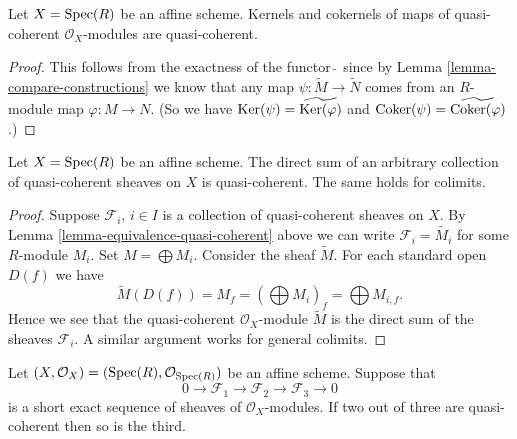 \begin{lemma}
\label{lemma-kernel-cokernel-quasi-coherent}
Let $X = \mathop{\mathrm{Spec}}(R)$ be an affine scheme.
Kernels and cokernels of maps of quasi-coherent
$\mathcal{O}_X$-modules are quasi-coherent.
\end{lemma}

\begin{proof}
This follows from the exactness of the functor $\widetilde{\ }$
since by Lemma \ref{lemma-compare-constructions} we know that any map
$\psi : \widetilde{M} \to \widetilde{N}$ comes from
an $R$-module map $\varphi : M \to N$. (So we have
$\mathop{\mathrm{Ker}}(\psi) = \widetilde{\mathop{\mathrm{Ker}}(\varphi)}$ and
$\mathop{\mathrm{Coker}}(\psi) = \widetilde{\mathop{\mathrm{Coker}}(\varphi)}$.)
\end{proof}

\begin{lemma}
\label{lemma-colimit-quasi-coherent}
Let $X = \mathop{\mathrm{Spec}}(R)$ be an affine scheme.
The direct sum of an arbitrary collection of quasi-coherent sheaves
on $X$ is quasi-coherent. The same holds for colimits.
\end{lemma}

\begin{proof}
Suppose $\mathcal{F}_i$, $i \in I$ is a collection of quasi-coherent
sheaves on $X$. By Lemma \ref{lemma-equivalence-quasi-coherent}
above we can write $\mathcal{F}_i = \widetilde{M_i}$ for some $R$-module
$M_i$. Set $M = \bigoplus M_i$. Consider the sheaf $\widetilde{M}$.
For each standard open $D(f)$ we have
$$
\widetilde{M}(D(f)) = M_f =
\left(\bigoplus M_i\right)_f =
\bigoplus M_{i, f}.
$$
Hence we see that the quasi-coherent $\mathcal{O}_X$-module
$\widetilde{M}$ is the direct sum of the sheaves $\mathcal{F}_i$.
A similar argument works for general colimits.
\end{proof}

\begin{lemma}
\label{lemma-extension-quasi-coherent}
Let $(X, \mathcal{O}_X) = (\mathop{\mathrm{Spec}}(R), \mathcal{O}_{\mathop{\mathrm{Spec}}(R)})$
be an affine scheme. Suppose that
$$
0 \to
\mathcal{F}_1 \to
\mathcal{F}_2 \to
\mathcal{F}_3 \to
0
$$
is a short exact sequence of sheaves of $\mathcal{O}_X$-modules.
If two out of three are quasi-coherent then so is the third.
\end{lemma}

